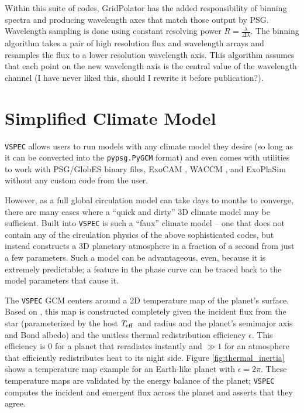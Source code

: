 \documentclass[twocolumn]{aastex631}
\newcommand{\teff}{$T_{\rm eff}$}
\newcommand{\TJ}[1]{\textcolor{tedcommentcolor}{#1}}
\newcommand{\vspec}[1]{\texttt{VSPEC}#1}
\begin{document}
Within this suite of codes, GridPolator has the added responsibility of binning spectra and producing wavelength axes that match those output by PSG. Wavelength sampling is done using constant resolving power $R=\frac{\lambda}{\Delta \lambda}$. The binning algorithm takes a pair of high resolution flux and wavelength arrays and resamples the flux to a lower resolution wavelength axis. This algorithm assumes that each point on the new wavelength axis is the central value of the wavelength channel \TJ{(I have never liked this, should I rewrite it before publication?)}. 

\section{Simplified Climate Model}
\vspec{} allows users to run models with any climate model they desire (so long as it can be converted into the \texttt{pypsg.PyGCM} format) and even comes with utilities to work with PSG/GlobES binary files, ExoCAM \citep{wolf2022}, WACCM \citep{marsh2013}, and ExoPlaSim \citep{paradise2022} without any custom code from the user.

However, as a full global circulation model can take days to months to converge, there are many cases where a ``quick and dirty'' 3D climate model may be sufficient. Built into \vspec{} is such a ``faux'' climate model -- one that does not contain any of the circulation physics of the above sophisticated codes, but instead constructs a 3D planetary atmosphere in a fraction of a second from just a few parameters. Such a model can be advantageous, even, because it is extremely predictable; a feature in the phase curve can be traced back to the model parameters that cause it.

The \vspec{} GCM centers around a 2D temperature map of the planet's surface. Based on \citet{cowan2011}, this map
is constructed completely given the incident flux from the star (parameterized by the host \teff~and radius
and the planet's semimajor axis and Bond albedo) and the unitless thermal redistribution efficiency $\epsilon$.
This efficiency is 0 for a planet that reradiates instantly and $\gg 1$ for an atmosphere that efficiently redistributes heat to its night side.
Figure \ref{fig:thermal_inertia} shows a temperature map example for an Earth-like planet with $\epsilon = 2\pi$.
These temperature maps are validated by the energy balance of the planet; \vspec{} computes the incident and emergent
flux across the planet and asserts that they agree.
\end{document}
